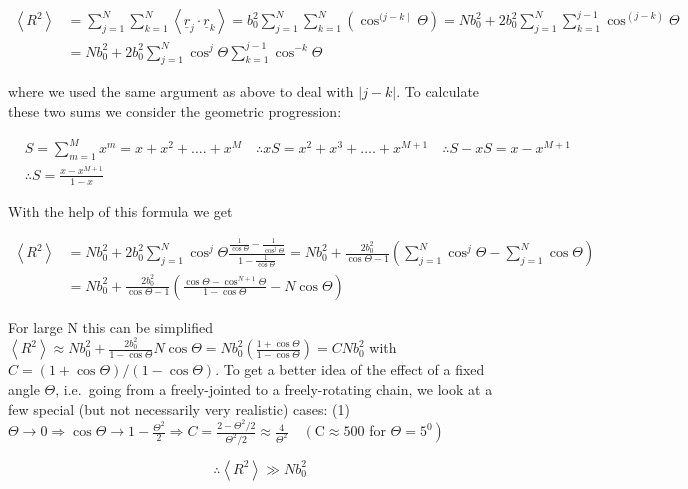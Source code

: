 \documentclass[
  letterpaper,
  DIV=11,
  numbers=noendperiod]{scrartcl}
\begin{document}
\[
\begin{aligned}
\left\langle R^{2}\right\rangle & =\sum_{j=1}^{N} \sum_{k=1}^{N}\left\langle\underline{r}_{j} \cdot \underline{r}_{k}\right\rangle=b_{0}^{2} \sum_{j=1}^{N} \sum_{k=1}^{N}\left(\cos ^{(j-k \mid} \Theta\right)=N b_{0}^{2}+2 b_{0}^{2} \sum_{j=1}^{N} \sum_{k=1}^{j-1} \cos ^{(j-k)} \Theta \\
& =N b_{0}^{2}+2 b_{0}^{2} \sum_{j=1}^{N} \cos ^{j} \Theta \sum_{k=1}^{j-1} \cos ^{-k} \Theta
\end{aligned}
\]

where we used the same argument as above to deal with \(|j-k|\). To
calculate these two sums we consider the geometric progression:

\[
\begin{aligned}
& S=\sum_{m=1}^{M} x^{m}=x+x^{2}+\ldots .+x^{M} \quad \therefore x S=x^{2}+x^{3}+\ldots .+x^{M+1} \quad \therefore S-x S=x-x^{M+1} \\
& \therefore S=\frac{x-x^{M+1}}{1-x}
\end{aligned}
\]

With the help of this formula we get

\[
\begin{aligned}
\left\langle R^{2}\right\rangle & =N b_{0}^{2}+2 b_{0}^{2} \sum_{j=1}^{N} \cos ^{j} \Theta \frac{\frac{1}{\cos \Theta}-\frac{1}{\cos ^{j} \Theta}}{1-\frac{1}{\cos \Theta}}=N b_{0}^{2}+\frac{2 b_{0}^{2}}{\cos \Theta-1}\left(\sum_{j=1}^{N} \cos ^{j} \Theta-\sum_{j=1}^{N} \cos \Theta\right) \\
& =N b_{0}^{2}+\frac{2 b_{0}^{2}}{\cos \Theta-1}\left(\frac{\cos \Theta-\cos ^{N+1} \Theta}{1-\cos \Theta}-N \cos \Theta\right)
\end{aligned}
\]

For large N this can be simplified
\(\left\langle R^{2}\right\rangle \approx N b_{0}^{2}+\frac{2 b_{0}^{2}}{1-\cos \Theta} N \cos \Theta=N b_{0}^{2}\left(\frac{1+\cos \Theta}{1-\cos \Theta}\right)=C N b_{0}^{2}\)
with \(C=(1+\cos \Theta) /(1-\cos \Theta)\). To get a better idea of the
effect of a fixed angle \(\Theta\), i.e.~going from a freely-jointed to
a freely-rotating chain, we look at a few special (but not necessarily
very realistic) cases: (1)
\(\Theta \rightarrow 0 \Rightarrow \cos \Theta \rightarrow 1-\frac{\Theta^{2}}{2} \Rightarrow C=\frac{2-\Theta^{2} / 2}{\Theta^{2} / 2} \approx \frac{4}{\Theta^{2}} \quad\left(\mathrm{C} \approx 500\right.\)
for \(\left.\Theta=5^{0}\right)\)

\[
\therefore\left\langle R^{2}\right\rangle \gg N b_{0}^{2}
\]
\end{document}
